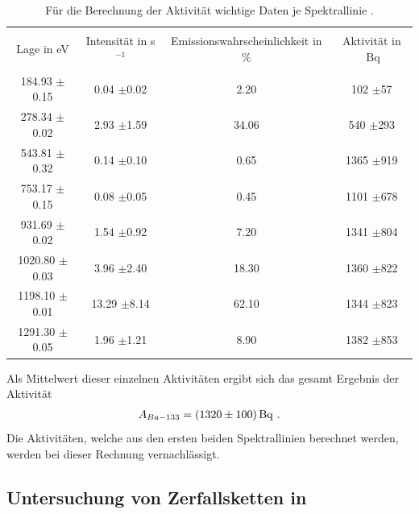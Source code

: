\begin{table}
\centering
\caption{Für die Berechnung der Aktivität wichtige Daten je Spektrallinie \cite{sample}.}
\begin{tabular}{c c c c}
\hline \\
Lage in eV & Intensität in s$^{-1}$&  Emissionswahrscheinlichkeit in \%& Aktivität in $\SI{}{\becquerel}$\\
\hline \\
184.93 $\pm$0.15  &  0.04  $\pm$0.02  &  2.20  &  102  $\pm$57 \\ 278.34 $\pm$0.02  &  2.93  $\pm$1.59  &  34.06  &  540  $\pm$293 \\ 543.81 $\pm$0.32  &  0.14  $\pm$0.10  &  0.65  &  1365  $\pm$919 \\ 753.17 $\pm$0.15  &  0.08  $\pm$0.05  &  0.45  &  1101  $\pm$678 \\ 931.69 $\pm$0.02  &  1.54  $\pm$0.92  &  7.20  &  1341  $\pm$804 \\ 1020.80 $\pm$0.03  &  3.96  $\pm$2.40  &  18.30  &  1360  $\pm$822 \\ 1198.10 $\pm$0.01  &  13.29  $\pm$8.14  &  62.10  &  1344  $\pm$823 \\ 1291.30 $\pm$0.05  &  1.96  $\pm$1.21  &  8.90  &  1382  $\pm$853 \\ 
\hline
\end{tabular}
\label{tab:a_d_1}
\end{table}
Als Mittelwert dieser einzelnen Aktivitäten ergibt sich das gesamt Ergebnis der Aktivität 
\begin{align*}
A_{Ba-133}=\SI{1320+-100}{\becquerel} \text{ .}
\end{align*}
Die Aktivitäten, welche aus den ersten beiden Spektrallinien berechnet werden, werden bei dieser Rechnung vernachlässigt.
\subsection{Untersuchung von Zerfallsketten in }
\label{subsec:a4}



